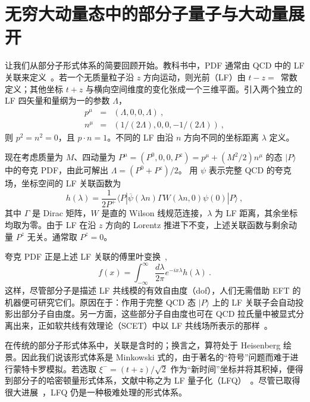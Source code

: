 \section{无穷大动量态中的部分子量子与大动量展开}
\label{sec:imf}

让我们从部分子形式体系的简要回顾开始。教科书中，PDF 通常由 QCD 中的 LF 关联来定义~\cite{Sterman:1994ce,Collins:2011zzd}。若一个无质量粒子沿 $z$ 方向运动，则光前（LF）由 $t-z=$~常数定义；其他坐标 $t+z$ 与横向空间维度的变化张成一个三维平面。引入两个独立的 LF 四矢量和量纲为一的参数 $\Lambda$，
\begin{eqnarray}
   p^\mu &=& (\Lambda, 0, 0, \Lambda )\ , \nonumber \\
   n^\mu &=& \left(1/(2\Lambda), 0, 0, -1/(2\Lambda)\right)\ ,
\end{eqnarray}
则 $p^2=n^2=0$，且 $p\cdot n=1$。不同的 LF 由沿 $n$ 方向不同的坐标距离 $\lambda$ 定义。

现在考虑质量为 $M$、四动量为
$P^\mu= (P^0,0,0,P^z)
= p^\mu + (M^2/2) n^\mu$ 的态 $|P\rangle$ 中的夸克 PDF，由此可解出 $\Lambda =(P^0+P^z)/2$。
用 $\psi$ 表示完整 QCD 的夸克场，坐标空间的 LF 关联函数为
\begin{equation}
     h(\lambda)= \frac{1}{2P^+}\langle P|\overline \psi(\lambda n)\Gamma W(\lambda n, 0)\psi(0)|P\rangle \ ,
\label{Eq:correlationm}
\end{equation}
其中 $\Gamma$ 是 Dirac 矩阵，$W$ 是直的 Wilson 线规范连接，$\lambda$ 为 LF 距离，其余坐标均取为零。由于 LF 在沿 $z$ 方向的 Lorentz 推进下不变，上述关联函数与剩余动量 $P^z$ 无关。通常取 $P^z=0$。

夸克 PDF 正是上述 LF 关联的傅里叶变换~\cite{Collins:2011zzd},
\begin{equation}
     f(x) =\int^\infty_{-\infty} \frac{d\lambda}{2\pi} e^{-ix\lambda}h(\lambda)  \ .
\end{equation}
这样，尽管部分子是描述 LF 共线模的有效自由度（dof），人们无需借助 EFT 的机器便可研究它们。原因在于：作用于完整 QCD 态 $|P\rangle$ 上的 LF 关联子会自动投影出部分子自由度。另一方面，这些部分子自由度也可在 QCD 拉氏量中被显式分离出来，正如软共线有效理论（SCET）中以 LF 共线场所表示的那样~\cite{Bauer:2000yr,Bauer:2001ct,Bauer:2001yt}。

在传统的部分子形式体系中，关联是含时的；换言之，算符处于 Heisenberg 绘景。因此我们说该形式体系是 Minkowski 式的，由于著名的``符号''问题而难于进行蒙特卡罗模拟。若选取 $\xi^- = (t+z)/\sqrt{2}$ 作为``新时间''坐标并将其积掉，便得到部分子的哈密顿量形式体系，文献中称之为 LF 量子化（LFQ）~\cite{Dirac:1949cp}。尽管已取得很大进展~\cite{Brodsky:1997de}，LFQ 仍是一种极难处理的形式体系。

